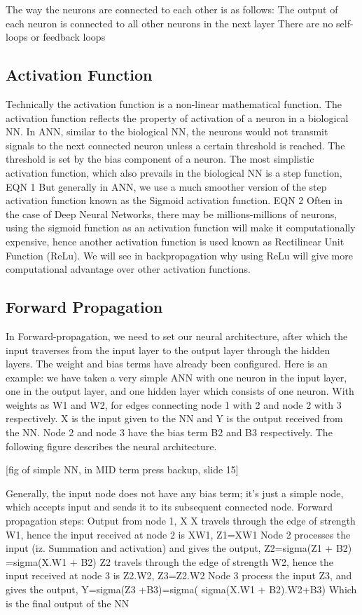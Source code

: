 The way the neurons are connected to each other is as follows:
The output of each neuron is connected to all other neurons in the next layer
There are no self-loops or feedback loops

\subsection{Activation Function}
Technically the activation function is a non-linear mathematical function. The activation function reflects the property of activation of a neuron in a biological NN. In ANN, similar to the biological NN, the neurons would not transmit signals to the next connected neuron unless a certain threshold is reached. The threshold is set by the bias component of a neuron. The most simplistic activation function, which also prevails in the biological NN is a step function, 
EQN 1
But generally in ANN, we use a much smoother version of the step activation function known as the Sigmoid activation function.
EQN 2
Often in the case of Deep Neural Networks, there may be millions-millions of neurons,  using the sigmoid function as an activation function will make it computationally expensive, hence another activation function is used known as Rectilinear Unit Function (ReLu). We will see in backpropagation why using ReLu will give more computational advantage over other activation functions.

\subsection{Forward Propagation}
In Forward-propagation, we need to set our neural architecture, after which the input traverses from the input layer to the output layer through the hidden layers. The weight and bias terms have already been configured. Here is an example: we have taken a very simple ANN with one neuron in the input layer, one in the output layer, and one hidden layer which consists of one neuron. With weights as W1 and W2, for edges connecting node 1 with 2 and node 2 with 3 respectively. X is the input given to the NN and Y is the output received from the NN. Node 2 and node 3 have the bias term B2 and B3 respectively. The following figure describes the neural architecture.

[fig of simple NN, in MID term press backup, slide 15]

Generally, the input node does not have any bias term; it's just a simple node, which accepts input and sends it to its subsequent connected node. 
Forward propagation steps:
Output from node 1, X
X travels through the edge of strength W1, hence the input received at node 2 is XW1, Z1=XW1
Node 2 processes the input (iz. Summation and activation) and gives the output, Z2=sigma(Z1 + B2) =sigma(X.W1 + B2)
Z2 travels through the edge of strength W2, hence the input received at node 3 is Z2.W2, Z3=Z2.W2
Node 3 process the input Z3, and gives the output, Y=sigma(Z3 +B3)=sigma( sigma(X.W1 + B2).W2+B3)
Which is the final output of the NN
